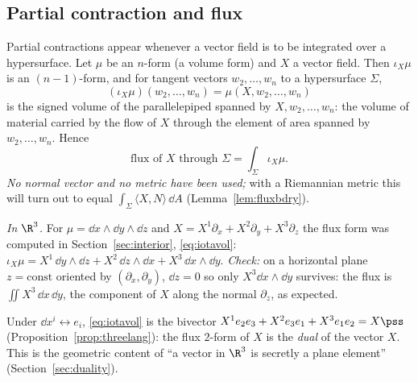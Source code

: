 \subsection{Partial contraction and flux}\label{sec:flux}

Partial contractions appear whenever a vector field is to be integrated over a hypersurface. Let $\mu$ be an $n$-form (\eg a volume form) and $X$ a vector field. Then $\iota_X\mu$ is an $(n-1)$-form, and for tangent vectors $w_2,\dots,w_n$ to a hypersurface $\Sigma$,
\[
(\iota_X\mu)(w_2,\dots,w_n)=\mu(X,w_2,\dots,w_n)
\]
is the signed volume of the parallelepiped spanned by $X,w_2,\dots,w_n$: the volume of material carried by the flow of $X$ through the element of area spanned by $w_2,\dots,w_n$. Hence
\begin{equation}\label{eq:flux}
\text{flux of }X\text{ through }\Sigma=\int_\Sigma\iota_X\mu .
\end{equation}
\emph{No normal vector and no metric have been used;} with a Riemannian metric this will turn out to equal $\int_\Sigma\langle X,N\rangle\,\dd A$ (Lemma~\ref{lem:fluxbdry}).

\emph{In $\R^3$.} For $\mu=\dd x\wedge\dd y\wedge\dd z$ and $X=X^1\partial_x+X^2\partial_y+X^3\partial_z$ the flux form was computed in
Section~\ref{sec:interior}, \eqref{eq:iotavol}: $\iota_X\mu=X^1\,\dd y\wedge\dd z+X^2\,\dd z\wedge\dd x+X^3\,\dd x\wedge\dd y$.
\emph{Check:} on a horizontal plane $z=\mathrm{const}$ oriented by $(\partial_x,\partial_y)$, $\dd z=0$ so only $X^3\dd x\wedge\dd y$ survives: the flux is $\iint X^3\,\dd x\,\dd y$, the component of $X$ along the normal $\partial_z$, as expected.

\begin{synthesis}
Under $\dd x^i\leftrightarrow e_i$, \eqref{eq:iotavol} is the bivector $X^1e_2e_3+X^2e_3e_1+X^3e_1e_2=X\pss$ (Proposition~\ref{prop:threelang}): the flux $2$-form of $X$ is the \emph{dual} of the vector $X$. This is the geometric content of ``a vector in $\R^3$ is secretly a plane element'' (Section~\ref{sec:duality}).
\end{synthesis}
